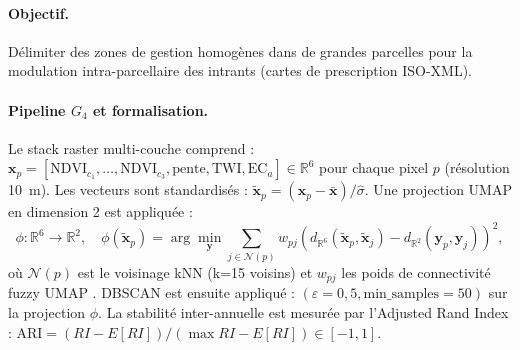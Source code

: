 \documentclass[12pt]{article}
\newcommand{\R}{\mathbb{R}}
\begin{document}
\paragraph{Objectif.} Délimiter des zones de gestion homogènes dans de grandes parcelles pour la modulation intra-parcellaire des intrants (cartes de prescription ISO-XML).

\paragraph{Pipeline $G_4$ et formalisation.} Le stack raster multi-couche comprend : $\bm{x}_p = [\text{NDVI}_{c_1}, \ldots, \text{NDVI}_{c_3}, \text{pente}, \text{TWI}, \text{EC}_a] \in \R^6$ pour chaque pixel $p$ (résolution 10~m). Les vecteurs sont standardisés : $\tilde{\bm{x}}_p = (\bm{x}_p - \bar{\bm{x}}) / \hat\sigma$. Une projection UMAP en dimension 2 est appliquée :
\begin{equation}
	\phi : \R^6 \to \R^2, \quad
	\phi(\tilde{\bm{x}}_p) = \arg\min_{\bm{y}}
	\sum_{j \in \mathcal{N}(p)} w_{pj} (d_{\R^6}(\tilde{\bm{x}}_p,
	\tilde{\bm{x}}_j) - d_{\R^2}(\bm{y}_p, \bm{y}_j))^2,
	\label{eq:umap}
\end{equation}
où $\mathcal{N}(p)$ est le voisinage kNN (k=15 voisins) et $w_{pj}$ les poids de connectivité fuzzy UMAP \cite{umap_paper}.  DBSCAN est ensuite appliqué : $(\varepsilon=0{,}5, \text{min\_samples}=50)$ sur la projection $\phi$. La stabilité inter-annuelle est mesurée par l'Adjusted Rand Index : $\text{ARI} = (RI - E[RI]) / (\max RI - E[RI]) \in [-1,1]$.

\end{document}
